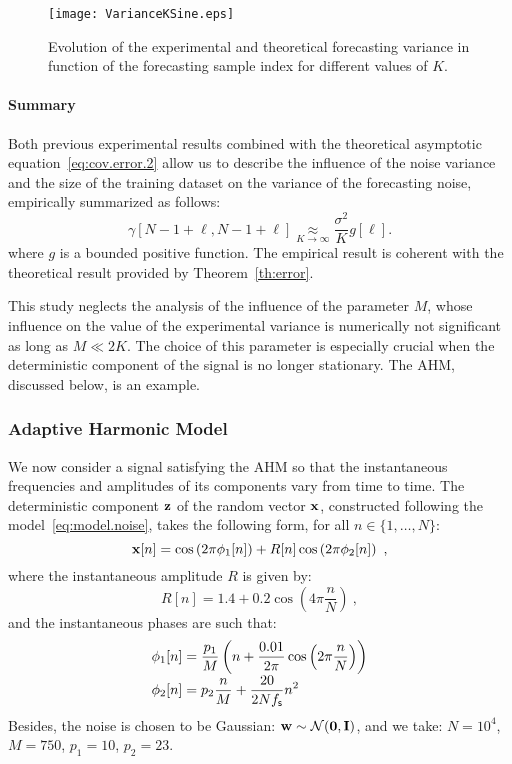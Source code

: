 \begin{figure}
\texttt{[image: VarianceKSine.eps]}
\caption{Evolution of the experimental and theoretical forecasting variance in function of the forecasting sample index for different values of $K$.}
\label{fig:res.size.sine}
\end{figure}

\paragraph{Summary}
Both previous experimental results combined with the theoretical asymptotic equation~\eqref{eq:cov.error.2} allow us to describe the influence of the noise variance and the size of the training dataset on the variance of the forecasting noise, empirically summarized as follows:
\begin{equation}
\gamma[N-1+\ell,N-1+\ell] \underset{K\to\infty}{\approx} \dfrac{\sigma^2}{K}g[\ell] .
\end{equation} 
where $g$ is a bounded positive function. The empirical result is coherent with the theoretical result provided by Theorem~\ref{th:error}.

This study neglects the analysis of the influence of the parameter $M$, whose influence on the value of the experimental variance is numerically not significant as long as $M\ll 2K$. The choice of this parameter is especially crucial when the deterministic component of the signal is no longer stationary. The AHM, discussed below, is an example.

\subsubsection{Adaptive Harmonic Model}
\label{ssse:res.ahm}
We now consider a signal satisfying the AHM so that the instantaneous frequencies and amplitudes of its components vary from time to time. The deterministic component ${\mathbf z}$ of the random vector ${\mathbf x}$, constructed following the model~\eqref{eq:model.noise}, takes the following form, for all $n\in\{1,\ldots,N\}$:
\[
{\mathbf x}[n] = \cos\left(2\pi \phi_1[n] \right) + R[n]\cos\left(2\pi \phi_2[n] \right) \ ,
\] 
where the instantaneous amplitude $R$ is given by:
\[
R[n] = 1.4 + 0.2\cos\left(4\pi\frac{n}{N}\right)\ ,
\]
and the instantaneous phases are such that:
\begin{align*}
\phi_1[n] &= \frac{p_1}{M}\left( n + \frac{0.01}{2\pi}\cos\left(2\pi\frac{n}{N}\right) \right) \\[-1mm]
\phi_2[n] & = p_2\frac{n}{M} + \frac{20}{2Nf_{\mathsf s}}n^2
\end{align*}
Besides, the noise is chosen to be Gaussian: ${\mathbf w}\sim{\mathcal N}(\boldsymbol{0},{\mathbf I})$, and we take: $N=10^4$, $M=750$, $p_1=10$, $p_2=23$.

